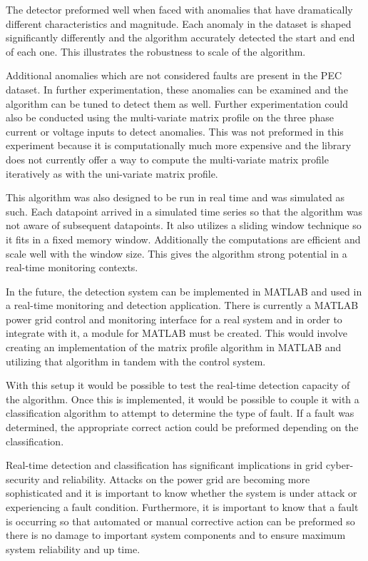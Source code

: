 The detector preformed well when faced with anomalies that have dramatically different characteristics and magnitude. Each anomaly in the dataset is shaped significantly differently and the algorithm accurately detected the start and end of each one. This illustrates the robustness to scale of the algorithm.

Additional anomalies which are not considered faults are present in the PEC dataset. In further experimentation, these anomalies can be examined and the algorithm can be tuned to detect them as well. Further experimentation could also be conducted using the multi-variate matrix profile on the three phase current or voltage inputs to detect anomalies. This was not preformed in this experiment because it is computationally much more expensive and the library does not currently offer a way to compute the multi-variate matrix profile iteratively as with the uni-variate matrix profile.

This algorithm was also designed to be run in real time and was simulated as such. Each datapoint arrived in a simulated time series so that the algorithm was not aware of subsequent datapoints. It also utilizes a sliding window technique so it fits in a fixed memory window. Additionally the computations are efficient and scale well with the window size. This gives the algorithm strong potential in a real-time monitoring contexts.

In the future, the detection system can be implemented in MATLAB and used in a real-time monitoring and detection application. There is currently a MATLAB power grid control and monitoring interface for a real system and in order to integrate with it, a module for MATLAB must be created. This would involve creating an implementation of the matrix profile algorithm in MATLAB and utilizing that algorithm in tandem with the control system.

With this setup it would be possible to test the real-time detection capacity of the algorithm. Once this is implemented, it would be possible to couple it with a classification algorithm to attempt to determine the type of fault. If a fault was determined, the appropriate correct action could be preformed depending on the classification. 

Real-time detection and classification has significant implications in grid cyber-security and reliability. Attacks on the power grid are becoming more sophisticated and it is important to know whether the system is under attack or experiencing a fault condition. Furthermore, it is important to know that a fault is occurring so that automated or manual corrective action can be preformed so there is no damage to important system components and to ensure maximum system reliability and up time.

